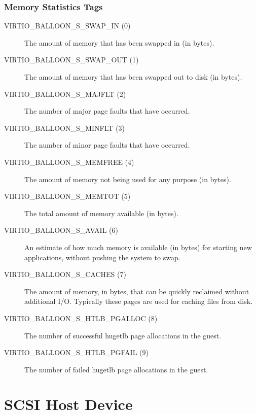 \subsubsection{Memory Statistics Tags}\label{sec:Device Types / Memory Balloon Device / Device Operation / Memory Statistics Tags}

\begin{description}
\item[VIRTIO_BALLOON_S_SWAP_IN (0)] The amount of memory that has been
  swapped in (in bytes).

\item[VIRTIO_BALLOON_S_SWAP_OUT (1)] The amount of memory that has been
  swapped out to disk (in bytes).

\item[VIRTIO_BALLOON_S_MAJFLT (2)] The number of major page faults that
  have occurred.

\item[VIRTIO_BALLOON_S_MINFLT (3)] The number of minor page faults that
  have occurred.

\item[VIRTIO_BALLOON_S_MEMFREE (4)] The amount of memory not being used
  for any purpose (in bytes).

\item[VIRTIO_BALLOON_S_MEMTOT (5)] The total amount of memory available
  (in bytes).

\item[VIRTIO_BALLOON_S_AVAIL (6)] An estimate of how much memory is available
  (in bytes) for starting new applications, without pushing the system to swap.

\item[VIRTIO_BALLOON_S_CACHES (7)] The amount of memory, in bytes, that can be
  quickly reclaimed without additional I/O. Typically these pages are used for
  caching files from disk.

\item[VIRTIO_BALLOON_S_HTLB_PGALLOC (8)] The number of successful hugetlb page
  allocations in the guest.

\item[VIRTIO_BALLOON_S_HTLB_PGFAIL (9)] The number of failed hugetlb page
  allocations in the guest.
\end{description}

\section{SCSI Host Device}\label{sec:Device Types / SCSI Host Device}

